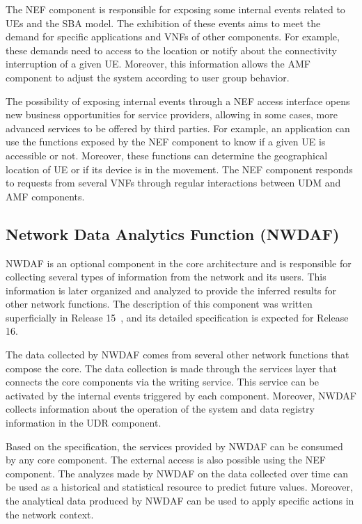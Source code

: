 The NEF component is responsible for exposing some internal events related to UEs and the SBA model. The exhibition of these events aims to meet the demand for specific applications and VNFs of other components. For example, these demands need to access to the location or notify about the connectivity interruption of a given UE. Moreover, this information allows the AMF component to adjust the system according to user group behavior.

The possibility of exposing internal events through a NEF access interface opens new business opportunities for service providers, allowing in some cases, more advanced services to be offered by third parties. For example, an application can use the functions exposed by the NEF component to know if a given UE is accessible or not. Moreover, these functions can determine the geographical location of UE or if its device is in the movement. The NEF component responds to requests from several VNFs through regular interactions between UDM and AMF components.


\subsection*{Network Data Analytics Function (NWDAF)}

NWDAF is an optional component in the core architecture and is responsible for collecting several types of information from the network and its users. This information is later organized and analyzed to provide the inferred results for other network functions. The description of this component was written superficially in Release 15~\cite{3gpp:rel15nr21.915}, and its detailed specification is expected for Release 16.

The data collected by NWDAF comes from several other network functions that compose the core. The data collection is made through the services layer that connects the core components via the writing service. This service can be activated by the internal events triggered by each component. Moreover, NWDAF collects information about the operation of the system and data registry information in the UDR component.

Based on the specification, the services provided by NWDAF can be consumed by any core component. The external access is also possible using the NEF component. The analyzes made by NWDAF on the data collected over time can be used as a historical and statistical resource to predict future values. Moreover, the analytical data produced by NWDAF can be used to apply specific actions in the network context.

